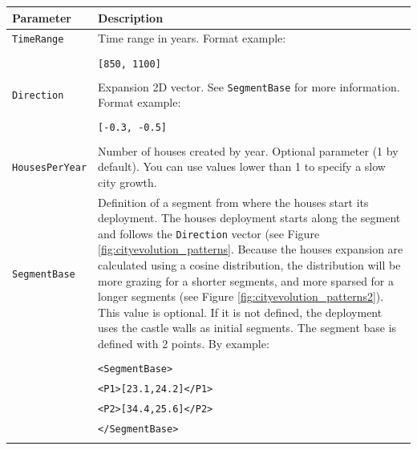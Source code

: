 \documentclass[tog]{acmsiggraph}
\begin{document}
\begin{tabularx}{0.48\textwidth}{ |l|X| }
\hline 
\textbf{Parameter} & \textbf{Description} \\[0.15cm]
 \hline
 \texttt{TimeRange} & Time range in years. Format example:\\
 & \\
 & \quad\texttt{[850, 1100]} \\
 & \\
 \hline
 \texttt{Direction} & Expansion 2D vector. See \texttt{SegmentBase} for more information. Format example: \\
 & \\
 & \quad\texttt{[-0.3, -0.5]} \\
 & \\
 \hline
 \texttt{HousesPerYear} & Number of houses created by year. Optional parameter (1 by default). You can use values lower than 1 to specify a slow city growth. \\ 
 \hline
 \texttt{SegmentBase} & Definition of a segment from where the houses start its deployment. The houses deployment starts along the segment and follows the \texttt{Direction} vector (see Figure \ref{fig:cityevolution_patterns}.
 Because the houses expansion are calculated using a cosine distribution, the distribution will be more grazing for a shorter segments, and more sparsed for a longer segments (see Figure \ref{fig:cityevolution_patterns2}). 
 This value is optional. 
 If it is not defined, the deployment uses the castle walls as initial segments. The segment base is defined with 2 points. By example:\\
 & \\
 & \quad\texttt{<SegmentBase>}\\
 & \quad\quad\texttt{<P1>[23.1,24.2]</P1>}\\
 & \quad\quad\texttt{<P2>[34.4,25.6]</P2>}\\
 & \quad\texttt{</SegmentBase>}\\
 & \\
 \hline 
\end{tabularx} 

 
 
 
 
\end{document}
